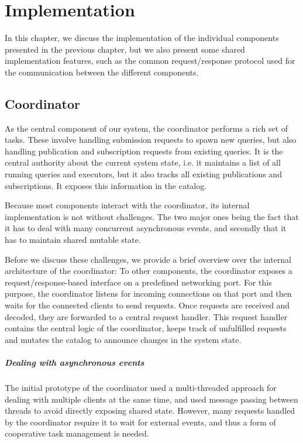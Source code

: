 \chapter{Implementation}\label{ch:impl}

In this chapter, we discuss the implementation of the individual components
presented in the previous chapter, but we also present some shared implementation
features, such as the common request/response protocol used for the
communication between the different components.

\section{Coordinator}

As the central component of our system, the coordinator performs a rich
set of tasks. These involve handling submission requests to spawn new queries,
but also handling publication and subscription requests from existing queries.
It is the central authority about the current system state, i.e. it maintains
a list of all running queries and executors, but it also tracks all existing
publications and subscriptions. It exposes this information in the catalog.

Because most components interact with the coordinator, its
internal implementation is not without challenges. The two major ones
being the fact that it has to deal with many concurrent asynchronous events,
and secondly that it has to maintain shared mutable state.

Before we discuss these challenges, we provide a brief overview over the
internal architecture of the coordinator: To other components, the coordinator
exposes a request/response-based interface on a predefined networking port.
For this purpose, the coordinator listens for incoming connections on that port
and then waits for the connected clients to send requests. Once requests are
received and decoded, they are forwarded to a central request handler. This
request handler contains the central logic of the coordinator, keeps track of
unfulfilled requests and mutates the catalog to announce changes in the
system state.

\paragraph{Dealing with asynchronous events}
The initial prototype of the coordinator used a multi-threaded approach for dealing
with multiple clients at the same time, and used message passing between threads
to avoid directly exposing shared state. However, many requests handled by
the coordinator require it to wait for external events, and thus a form of
cooperative task management is needed.

